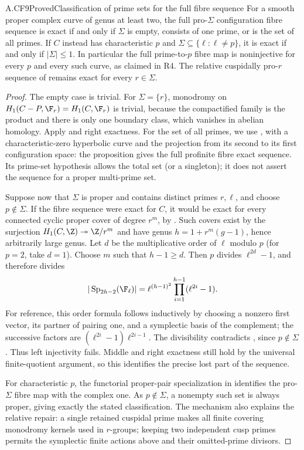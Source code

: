 \begin{claim}{A.CF9}{Proved}{Classification of prime sets for the full fibre sequence}
For a smooth proper complex curve of genus at least two, the full
pro-$\Sigma$ configuration fibre sequence is exact if and only if
$\Sigma$ is empty, consists of one prime, or is the set of all
primes. If $C$ instead has characteristic $p$ and
$\Sigma\subseteq\{\ell:\ell\ne p\}$, it is exact if and only if
$|\Sigma|\leq1$. In particular the full prime-to-$p$ fibre map is
noninjective for every $p$ and every such curve, as claimed in R4.
The relative cuspidally pro-$r$ sequence of
 remains exact for every $r\in\Sigma$.
\end{claim}
\begin{proof}
The empty case is trivial. For $\Sigma=\{r\}$, monodromy on
$H_1(C-P,\F_r)=H_1(C,\F_r)$ is trivial, because the compactified
family is the product and there is only one boundary class, which
vanishes in abelian homology. Apply  and right
exactness. For the set of all primes, we use
\citet[Proposition 2.2]{LA_MT2008}, with a characteristic-zero
hyperbolic curve and the projection from its second to its first
configuration space: the proposition gives the full profinite fibre
exact sequence. Its prime-set hypothesis allows the total set (or a
singleton); it does not assert the sequence for a proper multi-prime
set.

Suppose now that $\Sigma$ is proper and contains distinct primes
$r,\ell$, and choose $p\notin\Sigma$. If the fibre sequence were
exact for $C$, it would be exact for every connected cyclic proper
cover of degree $r^m$, by . Such covers exist by
the surjection $H_1(C,\Z)\twoheadrightarrow\Z/r^m$ and have genus
$h=1+r^m(g-1)$, hence arbitrarily large genus. Let $d$ be the
multiplicative order of $\ell$ modulo $p$ (for $p=2$, take $d=1$).
Choose $m$ such that $h-1\geq d$. Then $p$ divides
$\ell^{2d}-1$, and therefore divides
\[
 |\operatorname{Sp}_{2h-2}(\F_\ell)|
       =\ell^{(h-1)^2}\prod_{i=1}^{h-1}(\ell^{2i}-1).
\]
For reference, this order formula follows inductively by choosing a
nonzero first vector, its partner of pairing one, and a symplectic
basis of the complement; the successive factors are
$(\ell^{2i}-1)\ell^{2i-1}$. The divisibility contradicts
, since $p\notin\Sigma$. Thus left injectivity
fails. Middle and right exactness still hold by the universal
finite-quotient argument, so this identifies the precise lost part
of the sequence.

For characteristic $p$, the functorial proper-pair specialization in
 identifies the pro-$\Sigma$ fibre map with the
complex one. As $p\notin\Sigma$, a nonempty such set is always
proper, giving exactly the stated classification. The mechanism also
explains the relative repair: a single retained cuspidal prime makes
all finite covering monodromy kernels used in
 $r$-groups; keeping two independent cusp primes
permits the symplectic finite actions above and their omitted-prime
divisors.
\end{proof}

